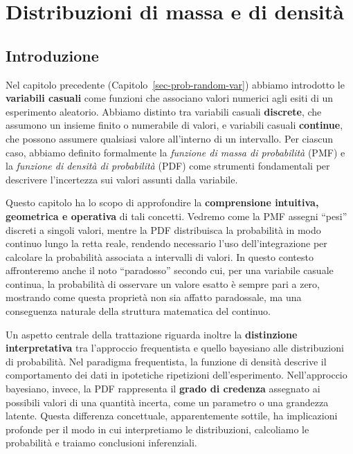 \documentclass[
  italian,
  letterpaper,
  a4paper,
  11pt,
  open=any]{scrbook}
\theoremstyle{plain}
\theoremstyle{definition}
\theoremstyle{definition}
\theoremstyle{remark}
\begin{document}
\chapter{Distribuzioni di massa e di densità}\label{sec-prob-distr}

\section*{Introduzione}\label{introduzione-6}


Nel capitolo precedente (Capitolo~\ref{sec-prob-random-var}) abbiamo
introdotto le \textbf{variabili casuali} come funzioni che associano
valori numerici agli esiti di un esperimento aleatorio. Abbiamo distinto
tra variabili casuali \textbf{discrete}, che assumono un insieme finito
o numerabile di valori, e variabili casuali \textbf{continue}, che
possono assumere qualsiasi valore all'interno di un intervallo. Per
ciascun caso, abbiamo definito formalmente la \emph{funzione di massa di
probabilità} (PMF) e la \emph{funzione di densità di probabilità} (PDF)
come strumenti fondamentali per descrivere l'incertezza sui valori
assunti dalla variabile.

Questo capitolo ha lo scopo di approfondire la \textbf{comprensione
intuitiva, geometrica e operativa} di tali concetti. Vedremo come la PMF
assegni ``pesi'' discreti a singoli valori, mentre la PDF distribuisca
la probabilità in modo continuo lungo la retta reale, rendendo
necessario l'uso dell'integrazione per calcolare la probabilità
associata a intervalli di valori. In questo contesto affronteremo anche
il noto ``paradosso'' secondo cui, per una variabile casuale continua,
la probabilità di osservare un valore esatto è sempre pari a zero,
mostrando come questa proprietà non sia affatto paradossale, ma una
conseguenza naturale della struttura matematica del continuo.

Un aspetto centrale della trattazione riguarda inoltre la
\textbf{distinzione interpretativa} tra l'approccio frequentista e
quello bayesiano alle distribuzioni di probabilità. Nel paradigma
frequentista, la funzione di densità descrive il comportamento dei dati
in ipotetiche ripetizioni dell'esperimento. Nell'approccio bayesiano,
invece, la PDF rappresenta il \textbf{grado di credenza} assegnato ai
possibili valori di una quantità incerta, come un parametro o una
grandezza latente. Questa differenza concettuale, apparentemente
sottile, ha implicazioni profonde per il modo in cui interpretiamo le
distribuzioni, calcoliamo le probabilità e traiamo conclusioni
inferenziali.
\end{document}
